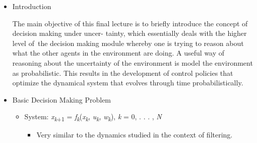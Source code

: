 \documentclass[12pt,twoside]{article}
\begin{document}
\vspace{\baselineskip}

\vspace{\baselineskip}
\begin{adjustwidth}{0.6in}{0.0in}
\par

\end{adjustwidth}


\vspace{\baselineskip}

\vspace{\baselineskip}
\begin{itemize}
	\item Introduction\par


\vspace{\baselineskip}
{\fontsize{10pt}{12.0pt}\selectfont The main objective of this final lecture is to briefly introduce the concept of decision making under uncer- tainty, which essentially deals with the higher level of\ the decision making module whereby one is trying  to reason about what the other agents in the environment are doing. A useful way of reasoning about the uncertainty of the environment is model the environment as probabilistic. This results in the development of control policies that optimize the dynamical system that evolves through time probabilistically.\par}\par


\vspace{\baselineskip}

\vspace{\baselineskip}
	\item Basic Decision Making Problem\par

\begin{itemize}
	\item {\fontsize{10pt}{12.0pt}\selectfont System: \textit{x\textsubscript{k}}\textsubscript{+1} = \textit{f\textsubscript{k}}(\textit{x\textsubscript{k}}, \textit{u\textsubscript{k}}, \textit{w\textsubscript{k}}), \textit{k }= 0, . . . , \textit{N}\par}\par

\begin{itemize}
	\item {\fontsize{10pt}{12.0pt}\selectfont Very similar to the dynamics studied in the context of filtering.\par}\par



\end{itemize}
\end{itemize}
\end{itemize}
\end{document}

